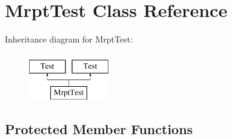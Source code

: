\hypertarget{class_mrpt_test}{}\section{Mrpt\+Test Class Reference}
\label{class_mrpt_test}
Inheritance diagram for Mrpt\+Test\+:\begin{figure}[H]
\begin{center}
\leavevmode
\includegraphics[height=2.000000cm]{class_mrpt_test}
\end{center}
\end{figure}
\subsection*{Protected Member Functions}
